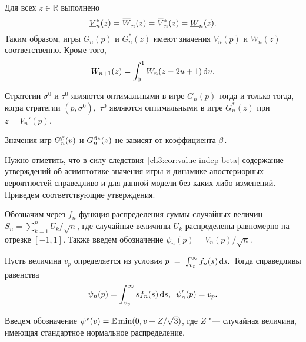 {\begin{theorem}
  Для всех $z \in \mathbb{R}$ выполнено
  \begin{equation}\label{ch3:eq:duality-relationships}
    \LV[*]{n}(z) = \HW{n}(z) = \HV[*]{n}(z) = \LW{n}(z).
  \end{equation}
  Таким образом, игры $G_n(p)$ и $G_n^*(z)$ имеют значения $V_n(p)$ и $W_n(z)$ соответственно.
  Кроме того,
  \begin{equation}\label{ch3:eq:W-recursive}
    W_{n+1}(z) = \int_0^1 W_n(z - 2u + 1) \mathop{}\!\mathrm{d} u.
  \end{equation}
\end{theorem}

\begin{theorem}\label{ch3:thm:optimal-strategies}
  Стратегии $\sigma^0$ и $\tau^0$ являются оптимальными в игре $G_n(p)$ тогда и только тогда, когда стратегии $(p, \sigma^0),$ $\tau^0$ являются оптимальными в игре $G_n^*(z)$ при $z = V_n'(p)$.
\end{theorem}

\begin{corollary}
  \label{ch3:cor:value-indep-beta}
  Значения игр $G^{\beta}_n(p)$ и $G^{\beta*}_n(z)$ не зависят от коэффициента $\beta$.
\end{corollary}

Нужно отметить, что в силу следствия~\ref{ch3:cor:value-indep-beta} содержание утверждений об асимптотике значения игры и динамике апостериорных вероятностей справедливо и для данной модели без каких-либо изменений.
Приведем соответствующие утверждения.

Обозначим через $f_n$ функция распределения суммы случайных величин $S_n = \sum_{k=1}^n U_k / \sqrt{n}$, где случайные величины $U_k$ распределены равномерно на отрезке $[-1, 1]$.
Также введем обозначение $\psi_n(p) = V_n(p)/\sqrt{n}$.

\begin{proposition}
Пусть величина $v_p$ определяется из условия 
$
  p~=~\int_{v_p}^\infty f_n(s) \mathop{}\!\mathrm{d} s.
$
Тогда справедливы равенства
\begin{equation*}
  \psi_n(p) = \int_{v_p}^\infty s f_n(s) \mathop{}\!\mathrm{d} s, \enskip
  \psi'_n(p) = v_p.
\end{equation*}
\end{proposition}

Введем обозначение $\psi^*(v) = \operatorname{\mathbb{E}} \min(0, v + Z/\sqrt{3})$, где $Z$ "--- случайная величина, имеющая стандартное нормальное распределение.

}
